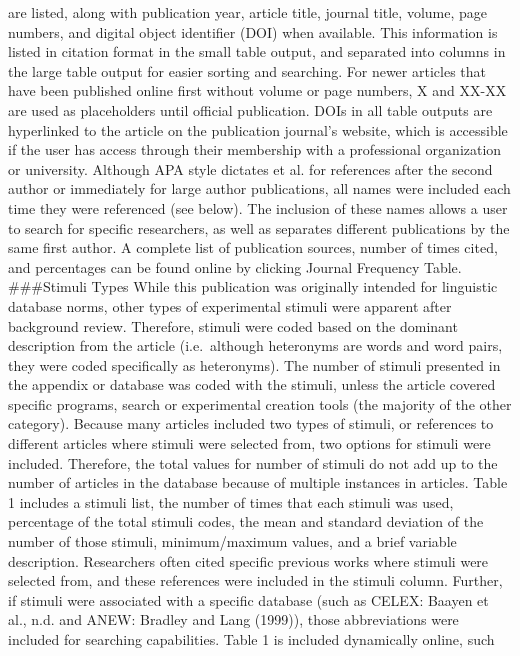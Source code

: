 \documentclass[english,man]{apa6}
\theoremstyle{definition}
\theoremstyle{definition}
\theoremstyle{definition}
\theoremstyle{remark}
\begin{document}
are listed, along with publication year, article title, journal title,
volume, page numbers, and digital object identifier (DOI) when
available. This information is listed in citation format in the small
table output, and separated into columns in the large table output for
easier sorting and searching. For newer articles that have been
published online first without volume or page numbers, X and XX-XX are
used as placeholders until official publication. DOIs in all table
outputs are hyperlinked to the article on the publication journal's
website, which is accessible if the user has access through their
membership with a professional organization or university. Although APA
style dictates et al. for references after the second author or
immediately for large author publications, all names were included each
time they were referenced (see below). The inclusion of these names
allows a user to search for specific researchers, as well as separates
different publications by the same first author. A complete list of
publication sources, number of times cited, and percentages can be found
online by clicking Journal Frequency Table. \#\#\#Stimuli Types While
this publication was originally intended for linguistic database norms,
other types of experimental stimuli were apparent after background
review. Therefore, stimuli were coded based on the dominant description
from the article (i.e.~although heteronyms are words and word pairs,
they were coded specifically as heteronyms). The number of stimuli
presented in the appendix or database was coded with the stimuli, unless
the article covered specific programs, search or experimental creation
tools (the majority of the other category). Because many articles
included two types of stimuli, or references to different articles where
stimuli were selected from, two options for stimuli were included.
Therefore, the total values for number of stimuli do not add up to the
number of articles in the database because of multiple instances in
articles. Table 1 includes a stimuli list, the number of times that each
stimuli was used, percentage of the total stimuli codes, the mean and
standard deviation of the number of those stimuli, minimum/maximum
values, and a brief variable description. Researchers often cited
specific previous works where stimuli were selected from, and these
references were included in the stimuli column. Further, if stimuli were
associated with a specific database (such as CELEX: Baayen et al., n.d.
and ANEW: Bradley and Lang (1999)), those abbreviations were included
for searching capabilities. Table 1 is included dynamically online, such
\end{document}
